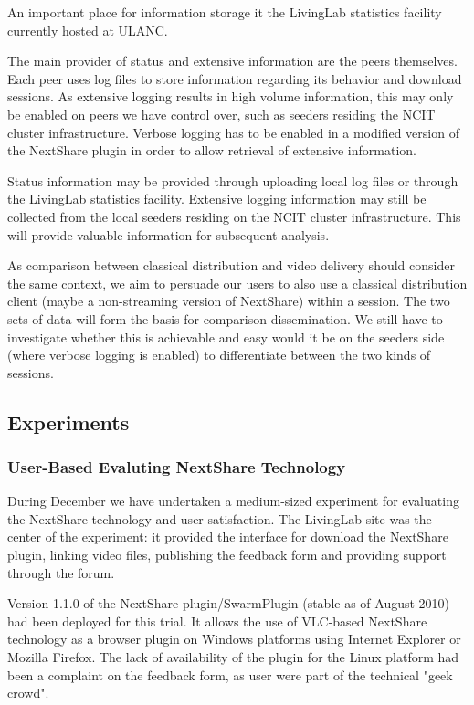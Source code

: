 An important place for information storage it the LivingLab statistics
facility currently hosted at ULANC.

The main provider of status and extensive information are the peers
themselves. Each peer uses log files to store information regarding its
behavior and download sessions. As extensive logging results in high volume
information, this may only be enabled on peers we have control over, such as
seeders residing the NCIT cluster infrastructure. Verbose logging has to be
enabled in a modified version of the NextShare plugin in order to allow
retrieval of extensive information.

Status information may be provided through uploading local log files or
through the LivingLab statistics facility. Extensive logging information may
still be collected from the local seeders residing on the NCIT cluster
infrastructure. This will provide valuable information for subsequent
analysis.

As comparison between classical distribution and video delivery should
consider the same context, we aim to persuade our users to also use a
classical distribution client (maybe a non-streaming version of NextShare)
within a session. The two sets of data will form the basis for comparison
dissemination. We still have to investigate whether this is achievable and
easy would it be on the seeders side (where verbose logging is enabled) to
differentiate between the two kinds of sessions.

\subsection{Experiments}
\label{subsec:multimedia-dist:evaluation-december-2010}

\subsubsection{User-Based Evaluting NextShare Technology}

During December we have undertaken a
medium-sized experiment for evaluating the NextShare technology and user
satisfaction. The LivingLab site was the center of the experiment: it
provided the interface for download the NextShare plugin, linking video files,
publishing the feedback form and providing support through the forum.

Version 1.1.0 of the NextShare plugin/SwarmPlugin (stable as of August 2010)
had been deployed for this trial. It allows the use of VLC-based NextShare
technology as a browser plugin on Windows platforms using Internet Explorer or
Mozilla Firefox. The lack of availability of the plugin for the Linux platform
had been a complaint on the feedback form, as user were part of the technical
"geek crowd".

